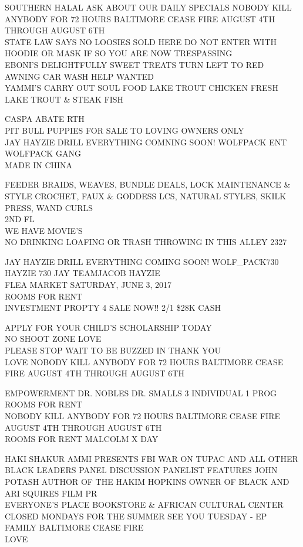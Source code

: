 \documentclass[10pt,letterpaper]{article}
\begin{document}
SOUTHERN HALAL ASK ABOUT OUR DAILY SPECIALS NOBODY KILL ANYBODY FOR 72 HOURS BALTIMORE CEASE FIRE AUGUST 4TH THROUGH AUGUST 6TH\\
STATE LAW SAYS NO LOOSIES SOLD HERE DO NOT ENTER WITH HOODIE OR MASK IF SO YOU ARE NOW TRESPASSING\\
EBONI'S DELIGHTFULLY SWEET TREATS TURN LEFT TO RED AWNING CAR WASH HELP WANTED\\
YAMMI'S CARRY OUT SOUL FOOD LAKE TROUT CHICKEN FRESH LAKE TROUT \& STEAK FISH

CASPA ABATE RTH\\
PIT BULL PUPPIES FOR SALE TO LOVING OWNERS ONLY\\
JAY HAYZIE DRILL EVERYTHING COMNING SOON!  WOLFPACK ENT WOLFPACK GANG\\
MADE IN CHINA

FEEDER BRAIDS, WEAVES, BUNDLE DEALS, LOCK MAINTENANCE \& STYLE CROCHET, FAUX \& GODDESS LCS, NATURAL STYLES, SKILK PRESS, WAND CURLS\\
2ND FL\\
WE HAVE MOVIE'S\\
NO DRINKING LOAFING OR TRASH THROWING IN THIS ALLEY 2327

JAY HAYZIE DRILL EVERYTHING COMING SOON! WOLF\_PACK730 HAYZIE 730 JAY TEAMJACOB HAYZIE\\
FLEA MARKET SATURDAY, JUNE 3, 2017\\
ROOMS FOR RENT\\
INVESTMENT PROPTY 4 SALE NOW!! 2/1 \$28K CASH

APPLY FOR YOUR CHILD'S SCHOLARSHIP TODAY\\
NO SHOOT ZONE LOVE\\
PLEASE STOP WAIT TO BE BUZZED IN THANK YOU\\
LOVE NOBODY KILL ANYBODY FOR 72 HOURS BALTIMORE CEASE FIRE AUGUST 4TH THROUGH AUGUST 6TH

EMPOWERMENT DR. NOBLES DR. SMALLS 3 INDIVIDUAL 1 PROG\\
ROOMS FOR RENT\\
NOBODY KILL ANYBODY FOR 72 HOURS BALTIMORE CEASE FIRE AUGUST 4TH THROUGH AUGUST 6TH\\
ROOMS FOR RENT MALCOLM X DAY

HAKI SHAKUR AMMI PRESENTS FBI WAR ON TUPAC AND ALL OTHER BLACK LEADERS PANEL DISCUSSION PANELIST FEATURES JOHN POTASH AUTHOR OF THE HAKIM HOPKINS OWNER OF BLACK AND ARI SQUIRES FILM PR\\
EVERYONE'S PLACE BOOKSTORE \& AFRICAN CULTURAL CENTER\\
CLOSED MONDAYS FOR THE SUMMER SEE YOU TUESDAY {-} EP FAMILY BALTIMORE CEASE FIRE\\
LOVE
\end{document}
